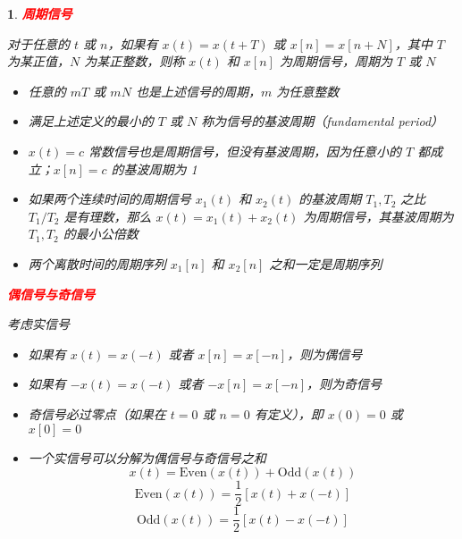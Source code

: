 \documentclass[UTF8]{report}
\theoremstyle{MyLineTheoremStyle} %
\theoremstyle{MyBlockTheoremStyle} %
\theoremstyle{MySubsubsectionStyle} %
\newtheorem{definition}{}
\begin{document}
\begin{definition}
    \textbf{\textcolor{red}{周期信号}}\par
    \vspace{1em}
    对于任意的 $t$ 或 $n$，如果有 $x(t) = x(t + T)$ 或 $x[n] = x[n + N]$，其中 $T$ 为某正值，$N$ 为某正整数，则称 $x(t)$ 和 $x[n]$ 为周期信号，周期为 $T$ 或 $N$
    \begin{itemize}
        \item 任意的 $mT$ 或 $mN$ 也是上述信号的周期，$m$ 为任意整数
        \item 满足上述定义的最小的 $T$ 或 $N$ 称为信号的基波周期（fundamental period）
        \item $x(t) = c$ 常数信号也是周期信号，但没有基波周期，因为任意小的 $T$ 都成立；$x[n] = c$ 的基波周期为 1
        \item 如果两个连续时间的周期信号 $x_1(t)$ 和 $x_2(t)$ 的基波周期 $T_1, T_2$ 之比 $T_1/T_2$ 是有理数，那么 $x(t) = x_1(t) + x_2(t)$ 为周期信号，其基波周期为 $T_1, T_2$ 的最小公倍数
        \item 两个离散时间的周期序列 $x_1[n]$ 和 $x_2[n]$ 之和一定是周期序列
    \end{itemize}

    \textbf{\textcolor{red}{偶信号与奇信号}}\par
\vspace{1em}
    考虑实信号
    \begin{itemize}
        \item 如果有 $x(t) = x(-t)$ 或者 $x[n] = x[-n]$，则为偶信号
        \item 如果有 $-x(t) = x(-t)$ 或者 $-x[n] = x[-n]$，则为奇信号
        \item 奇信号必过零点（如果在 $t = 0$ 或 $n = 0$ 有定义），即 $x(0) = 0$ 或 $x[0] = 0$
        \item 一个实信号可以分解为偶信号与奇信号之和
        \[
        x(t) = \text{Even}(x(t)) + \text{Odd}(x(t))
        \]
        \[
        \text{Even}(x(t)) = \frac{1}{2} [x(t) + x(-t)]
        \]
        \[
        \text{Odd}(x(t)) = \frac{1}{2} [x(t) - x(-t)]
        \]
    \end{itemize}


\end{definition}
\end{document}
